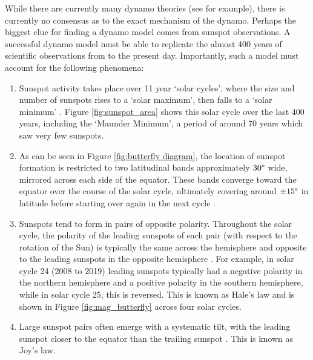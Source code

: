 \documentclass[11pt,a4paper,onecolumn]{report}
\begin{document}
While there are currently many dynamo theories (see
\citealt{charbonneau_dynamo_2020} for example), there is currently no consensus as
to the exact mechanism of the dynamo. Perhaps the biggest clue for finding a
dynamo model comes from sunspot observations. A successful dynamo model must be
able to replicate the almost 400 years of scientific observations from
\citet{galilei_sunspots_2010} to the present day. Importantly, such a model
must account for the following phenomena:
\begin{enumerate}
  \item Sunspot activity takes place over 11 year `solar cycles', where the size
  and number of sunspots rises to a `solar maximum', then falls to a `solar
  minimum' \citep{schwabe_astronomische_1844}. Figure \ref{fig:sunspot_area}
  shows this solar cycle over the last 400 years, including the `Maunder
  Minimum', a period of around 70 years which saw very few sunspots.

  \item As can be seen in Figure \ref{fig:butterfly diagram}, the location of sunspot
  formation is restricted to two latitudinal bands approximately \(30\degree\)
  wide, mirrored across each side of the equator. These bands converge toward the equator
  over the course of the solar cycle, ultimately covering around \(\pm 15\degree\)
  in latitude before starting over again in the next cycle
  \citep{carrington_observations_1863}.
  \item Sunspots tend to form in pairs of opposite polarity. Throughout the
  solar cycle, the polarity of the leading sunspots of each pair (with respect
  to the rotation of the Sun) is typically the same across the hemisphere and
  opposite to the leading sunspots in the opposite hemisphere
  \citep{hale_law_1925}. For example, in solar cycle 24 (2008 to 2019) leading
  sunspots typically had a negative polarity in the northern hemisphere and a
  positive polarity in the southern hemisphere, while in solar cycle 25, this is
  reversed. This is known as Hale's law and is shown in Figure
  \ref{fig:mag_butterfly} across four solar cycles.

  \item Large sunspot pairs often emerge with a systematic tilt, with the
  leading sunspot closer to the equator than the trailing sunspot
  \citep{hale_magnetic_1919}. This is known as Joy's law.
\end{enumerate}
\end{document}
